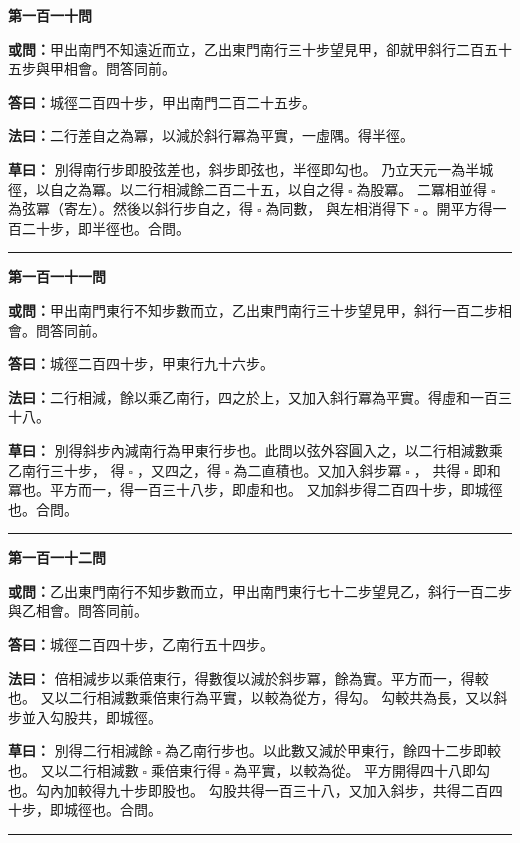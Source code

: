 \documentclass[11pt,a4paper]{article}
\let\origsquare\square
\renewcommand{\square}{\ensuremath{\origsquare}}%
\newcommand{\longline}{\noindent\rule{\textwidth}{0.4pt}}
\newcommand{\owen}[1]{%
  \par\vspace{0.4em}%
  \noindent\textcolor{problemcolor}{\textbf{或問：}}{\tradfont #1}\par\nopagebreak%
}
\newcommand{\fayue}[1]{%
  \par\noindent\textcolor{methodcolor}{\textbf{法曰：}}{\tradfont #1}\par\nopagebreak%
}
\newcommand{\tsaoyue}[1]{%
  \par\noindent\textcolor{workcolor}{\textbf{草曰：}}{\tradfont #1}\par%
}
\newcommand{\dayue}[1]{%
  \par\noindent\textcolor{anscolor}{\textbf{答曰：}}{\tradfont #1}\par\nopagebreak%
}
\newcommand{\wen}[1]{\par\vspace{0.3em}\noindent\textcolor{problemcolor}{\textbf{第#1問}}\par}
\begin{document}
\wen{一百一十}
\owen{甲出南門不知遠近而立，乙出東門南行三十步望見甲，卻就甲斜行二百五十五步與甲相會。問答同前。}
\dayue{城徑二百四十步，甲出南門二百二十五步。}

\fayue{二行差自之為冪，以減於斜行冪為平實，一虛隅。得半徑。}

\tsaoyue{%
別得南行步即股弦差也，斜步即弦也，半徑即勾也。
乃立天元一為半城徑，以自之為冪。以二行相減餘二百二十五，以自之得$ \; \square \; $為股冪。
二冪相並得$ \; \square \; $為弦冪（寄左）。然後以斜行步自之，得$ \; \square \; $為同數，
與左相消得下$ \; \square \; $。開平方得一百二十步，即半徑也。合問。}

\vspace{0.5cm}
\begin{center}
\longline
\end{center}

\wen{一百一十一}
\owen{甲出南門東行不知步數而立，乙出東門南行三十步望見甲，斜行一百二步相會。問答同前。}
\dayue{城徑二百四十步，甲東行九十六步。}

\fayue{二行相減，餘以乘乙南行，四之於上，又加入斜行冪為平實。得虛和一百三十八。}

\tsaoyue{%
別得斜步內減南行為甲東行步也。此問以弦外容圓入之，以二行相減數乘乙南行三十步，
得$ \; \square \; $，又四之，得$ \; \square \; $為二直積也。又加入斜步冪$ \; \square \; $，
共得$ \; \square \; $即和冪也。平方而一，得一百三十八步，即虛和也。
又加斜步得二百四十步，即城徑也。合問。}

\vspace{0.5cm}
\begin{center}
\longline
\end{center}

\wen{一百一十二}
\owen{乙出東門南行不知步數而立，甲出南門東行七十二步望見乙，斜行一百二步與乙相會。問答同前。}
\dayue{城徑二百四十步，乙南行五十四步。}

\fayue{%
倍相減步以乘倍東行，得數復以減於斜步冪，餘為實。平方而一，得較也。
又以二行相減數乘倍東行為平實，以較為從方，得勾。
勾較共為長，又以斜步並入勾股共，即城徑。}

\tsaoyue{%
別得二行相減餘$ \; \square \; $為乙南行步也。以此數又減於甲東行，餘四十二步即較也。
又以二行相減數$ \; \square \; $乘倍東行得$ \; \square \; $為平實，以較為從。
平方開得四十八即勾也。勾內加較得九十步即股也。
勾股共得一百三十八，又加入斜步，共得二百四十步，即城徑也。合問。}

\vspace{0.5cm}
\begin{center}
\longline
\end{center}
\end{document}
